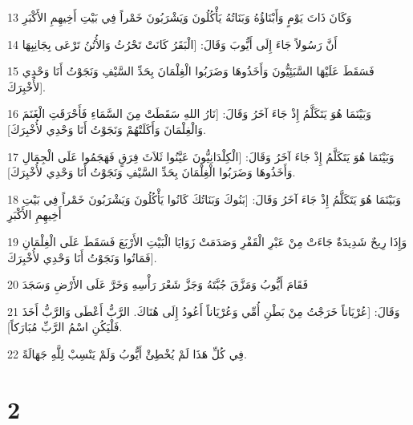 \par 13 وَكَانَ ذَاتَ يَوْمٍ وَأَبْنَاؤُهُ وَبَنَاتُهُ يَأْكُلُونَ وَيَشْرَبُونَ خَمْراً فِي بَيْتِ أَخِيهِمِ الأَكْبَرِ
\par 14 أَنَّ رَسُولاً جَاءَ إِلَى أَيُّوبَ وَقَالَ: [الْبَقَرُ كَانَتْ تَحْرُثُ وَالأُتُنُ تَرْعَى بِجَانِبِهَا
\par 15 فَسَقَطَ عَلَيْهَا السَّبَئِيُّونَ وَأَخَذُوهَا وَضَرَبُوا الْغِلْمَانَ بِحَدِّ السَّيْفِ وَنَجَوْتُ أَنَا وَحْدِي لأُخْبِرَكَ].
\par 16 وَبَيْنَمَا هُوَ يَتَكَلَّمُ إِذْ جَاءَ آخَرُ وَقَالَ: [نَارُ اللهِ سَقَطَتْ مِنَ السَّمَاءِ فَأَحْرَقَتِ الْغَنَمَ وَالْغِلْمَانَ وَأَكَلَتْهُمْ وَنَجَوْتُ أَنَا وَحْدِي لأُخْبِرَكَ].
\par 17 وَبَيْنَمَا هُوَ يَتَكَلَّمُ إِذْ جَاءَ آخَرُ وَقَالَ: [الْكِلْدَانِيُّونَ عَيَّنُوا ثَلاَثَ فِرَقٍ فَهَجَمُوا عَلَى الْجِمَالِ وَأَخَذُوهَا وَضَرَبُوا الْغِلْمَانَ بِحَدِّ السَّيْفِ وَنَجَوْتُ أَنَا وَحْدِي لأُخْبِرَكَ].
\par 18 وَبَيْنَمَا هُوَ يَتَكَلَّمُ إِذْ جَاءَ آخَرُ وَقَالَ: [بَنُوكَ وَبَنَاتُكَ كَانُوا يَأْكُلُونَ وَيَشْرَبُونَ خَمْراً فِي بَيْتِ أَخِيهِمِ الأَكْبَرِ
\par 19 وَإِذَا رِيحٌ شَدِيدَةٌ جَاءَتْ مِنْ عَبْرِ الْقَفْرِ وَصَدَمَتْ زَوَايَا الْبَيْتِ الأَرْبَعَ فَسَقَطَ عَلَى الْغِلْمَانِ فَمَاتُوا وَنَجَوْتُ أَنَا وَحْدِي لأُخْبِرَكَ].
\par 20 فَقَامَ أَيُّوبُ وَمَزَّقَ جُبَّتَهُ وَجَزَّ شَعْرَ رَأْسِهِ وَخَرَّ عَلَى الأَرْضِ وَسَجَدَ
\par 21 وَقَالَ: [عُرْيَاناً خَرَجْتُ مِنْ بَطْنِ أُمِّي وَعُرْيَاناً أَعُودُ إِلَى هُنَاكَ. الرَّبُّ أَعْطَى وَالرَّبُّ أَخَذَ فَلْيَكُنِ اسْمُ الرَّبِّ مُبَارَكاً].
\par 22 فِي كُلِّ هَذَا لَمْ يُخْطِئْ أَيُّوبُ وَلَمْ يَنْسِبْ لِلَّهِ جَهَالَةً.

\chapter{2}

